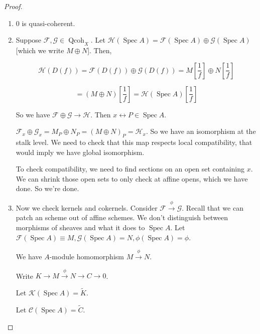 \documentclass{article}
\theoremstyle{definition}
\begin{document}
    \begin{proof}
        \begin{enumerate}[label=\arabic*)]
            \item \(0\) is quasi-coherent.
            \item Suppose \(\mathcal{F}, \mathcal{G} \in \operatorname{Qcoh}_X\). Let \(\mathcal{H}(\operatorname{Spec} A) = \mathcal{F} (\operatorname{Spec} A) \oplus \mathcal{G} (\operatorname{Spec} A)\) [which we write \(M \oplus N\)]. Then,
            
            \[
                \mathcal{H}(D(f)) = \mathcal{F} (D(f)) \oplus \mathcal{G}(D(f)) = M \left[ \frac{1}{f} \right] \oplus N \left[ \frac{1}{f} \right]
            \]

            \[
                = (M \oplus N) \left[ \frac{1}{f} \right] = \mathcal{H} (\operatorname{Spec} A) \left[ \frac{1}{f} \right]
            \]

            So we have \(\mathcal{F} \oplus \mathcal{G} \to \mathcal{H}\). Then \(x\leftrightarrow P \in \operatorname{Spec} A\).

            \(\mathcal{F}_x \oplus \mathcal{G}_x = M_P \oplus N_P = (M \oplus N)_P = \mathcal{H}_x\). So we have an isomorphism at the stalk level. We need to check that this map respects local compatibility, that would imply we have global isomorphism.

            To check compatibility, we need to find sections on an open set containing \(x\). We can shrink those open sets to only check at affine opens, which we have done. So we're done.

            \item Now we check kernels and cokernels. Consider \(\mathcal{F} \xrightarrow{\phi} \mathcal{G}\). Recall that we can patch an scheme out of affine schemes. We don't distinguish between morphisms of sheaves and what it does to \(\operatorname{Spec} A\). Let \(\mathcal{F}(\operatorname{Spec} A) \equiv  M, \mathcal{G} (\operatorname{Spec} A) = N, \phi(\operatorname{Spec} A) = \phi\).
            
            We have \(A\)-module homomorphism \(M \xrightarrow{\phi} N\).

            Write \(K \to M \xrightarrow{\phi} N \to C \to 0\).

            Let \(\mathcal{K}(\operatorname{Spec} A) = \widetilde{K}\).

            Let \(\mathcal{C}(\operatorname{Spec} A) = \widetilde{C}\).


\end{enumerate}
\end{proof}
\end{document}
